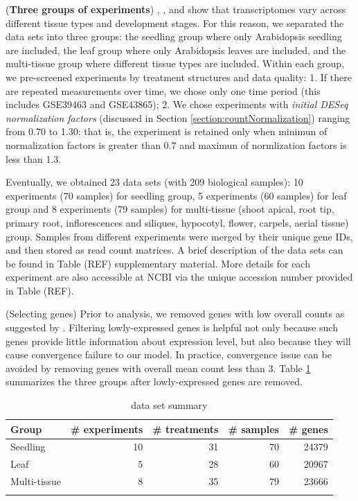 \documentclass[11pt, a4paper]{article}
\begin{document}
  
   
   
  (\textbf{Three groups of experiments}) \cite{czechowski2005genome}, \cite{hruz2011refgenes}, and
   \cite{dekkers2012identification} show that transcriptomes vary across different tissue types and development stages. For this reason, we separated the data sets into three groups: the seedling group where only Arabidopsis seedling are included, the leaf group where only Arabidopsis leaves are included, and the multi-tissue group where different tissue types are included. Within each group, we pre-screened experiments by treatment structures and data quality: 1. If there are repeated measurements over time, we chose only one time period (this includes GSE39463 and GSE43865); 2. We chose experiments with \textit{initial DESeq normalization factors} (discussed in Section \ref{section:countNormalization}) ranging from 0.70 to 1.30: that is, the experiment is retained only when minimun of normalization factors is greater than 0.7 and maximun of normlization factors is less than 1.3. 
   
    Eventually, we obtained 23 data sets (with 209 biological samples): 10 experiments (70 samples) for seedling group, 5 experiments (60 samples) for leaf group and 8 experiments (79 samples) for multi-tissue (shoot apical,  root tip, primary root, inflorescences and siliques, hypocotyl, flower, carpels, aerial tissue) group. Samples from different experiments were merged by their unique gene IDs, and then stored as read count matrices. A brief description of the data sets can be found in Table (REF) supplementary material. More details for each experiment are also accessible at NCBI via the unique accession number provided in Table (REF).
   
   
	 (Selecting genes) Prior to analysis, we removed genes with low overall counts as suggested by \cite{anders2013count}. Filtering lowly-expressed genes is helpful not only because such genes provide little information about expression level,  but also because they will cause convergence failure to our model. In practice, convergence issue can be avoided by removing genes with overall mean count less than 3. Table \ref{table:TableSet3} summarizes the three groups after  lowly-expressed genes are removed.
   
   \begin{table}[h]
   	\centering
   	\caption[3.2]{data set summary}
   	\begin{tabular}{lrrrr} \hline
   		Group & \#  experiments & \# treatments  & \# samples & \# genes \\ \hline
   		Seedling &10 & 31 &70  &24379  \\
   		Leaf &5 & 28 & 60 &20967  \\
   		Multi-tissue &8 &35  &79  & 23666\\ \hline
   		 \label{table:TableSet3}
   	\end{tabular}
   \end{table}
   
\end{document}
